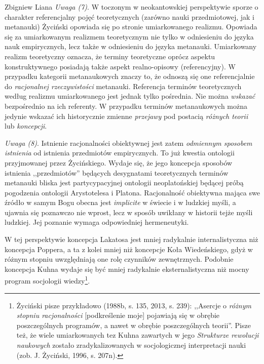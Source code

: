 \begin{artplenv}{Zbigniew Liana}
\textit{Uwaga (7)}. W toczonym w neokantowskiej perspektywie sporze o charakter referencjalny pojęć teoretycznych (zarówno
nauki przedmiotowej, jak i metanauki) Życiński opowiada się po stronie umiarkowanego realizmu. Opowiada się za
umiarkowanym realizmem teoretycznym nie tylko w odniesieniu do języka nauk empirycznych, lecz także w odniesieniu do
języka metanauki. Umiarkowany realizm teoretyczny oznacza, że terminy teoretyczne oprócz aspektu konstruktywnego
posiadają także aspekt realno-opisowy (referencyjny). W przypadku kategorii metanaukowych znaczy to, że odnoszą się one
referencjalnie do \textit{racjonalnej rzeczywistości} metanauki. Referencja terminów teoretycznych według realizmu
umiarkowanego jest jednak tylko pośrednia. Nie można \textit{wskazać }bezpośrednio na ich referenty. W przypadku terminów
metanaukowych można jedynie wskazać ich historycznie zmienne \textit{przejawy} pod postacią \textit{różnych teorii
}lub\textit{ koncepcji}.

\textit{Uwaga (8)}. Istnienie racjonalności obiektywnej jest zatem \textit{odmiennym sposobem istnienia} od istnienia
przedmiotów empirycznych. To już kwestia ontologii przyjmowanej przez Życińskiego. Wydaje się, że jego koncepcja
sposobów istnienia ,,przedmiotów'' będących desygnatami teoretycznych terminów metanauki bliska jest partycypacyjnej
ontologii neoplatońskiej będącej próbą pogodzenia ontologii Arystotelesa i Platona. Racjonalność obiektywna mająca swe
źródło w samym Bogu obecna jest \textit{implicite} w świecie i w ludzkiej myśli, a ujawnia się poznawczo nie wprost,
lecz w sposób uwikłany w historii tejże myśli ludzkiej. Jej poznanie wymaga odpowiedniej hermeneutyki.

W tej perspektywie koncepcja Lakatosa jest mniej radykalnie internalistyczna niż koncepcja Poppera, a ta z kolei mniej
niż koncepcje Koła Wiedeńskiego, gdyż w różnym stopniu uwzględniają one rolę czynników zewnętrznych. Podobnie koncepcja
Kuhna wydaje się być mniej radykalnie eksternalistyczna niż mocny program socjologii wiedzy\footnote{Życiński pisze
przykładowo \label{ref:RNDMFFbOpIuQe}(1988b, s. 135, 2013, s. 239): ,,Asercje o \textit{różnym stopniu racjonalności}
[podkreślenie moje] pojawiają się w obrębie poszczególnych programów, a nawet w obrębie poszczególnych teorii''. Pisze
też, że wiele umiarkowanych tez Kuhna zawartych w jego \textit{Strukturze rewolucji naukowych} zostało
zradykalizowanych w socjologicznej interpretacji nauki \label{ref:RND7QncKOKY2H}(zob. J. Życiński, 1996, s. 207n).}.


\end{artplenv}
